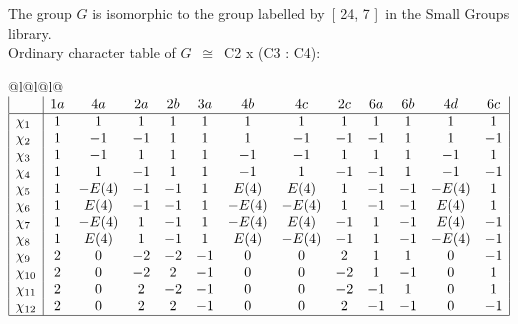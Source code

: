 \documentclass[varwidth=\maxdimen,border=10]{standalone}
\begin{document}
The group $G$ is isomorphic to the group labelled by\ [ 24, 7 ]\ in the Small Groups library.\\
Ordinary character table of $G$\ $\cong$\ C2 x (C3 : C4):\\
\begin{center}
\begin{tabular}{@{}l@{}l@{}l@{}}
\hline
\(\begin{array}{|l|cccccccccccc|}
  & 1a & 4a & 2a & 2b & 3a & 4b & 4c & 2c & 6a & 6b & 4d & 6c\\ \hline
\chi_{1} & 1 & 1 & 1 & 1 & 1 & 1 & 1 & 1 & 1 & 1 & 1 & 1\\
\chi_{2} & 1 & -1 & -1 & 1 & 1 & 1 & -1 & -1 & -1 & 1 & 1 & -1\\
\chi_{3} & 1 & -1 & 1 & 1 & 1 & -1 & -1 & 1 & 1 & 1 & -1 & 1\\
\chi_{4} & 1 & 1 & -1 & 1 & 1 & -1 & 1 & -1 & -1 & 1 & -1 & -1\\
\chi_{5} & 1 & -E(4) & -1 & -1 & 1 & E(4) & E(4) & 1 & -1 & -1 & -E(4) & 1\\
\chi_{6} & 1 & E(4) & -1 & -1 & 1 & -E(4) & -E(4) & 1 & -1 & -1 & E(4) & 1\\
\chi_{7} & 1 & -E(4) & 1 & -1 & 1 & -E(4) & E(4) & -1 & 1 & -1 & E(4) & -1\\
\chi_{8} & 1 & E(4) & 1 & -1 & 1 & E(4) & -E(4) & -1 & 1 & -1 & -E(4) & -1\\
\chi_{9} & 2 & 0 & -2 & -2 & -1 & 0 & 0 & 2 & 1 & 1 & 0 & -1\\
\chi_{10} & 2 & 0 & -2 & 2 & -1 & 0 & 0 & -2 & 1 & -1 & 0 & 1\\
\chi_{11} & 2 & 0 & 2 & -2 & -1 & 0 & 0 & -2 & -1 & 1 & 0 & 1\\
\chi_{12} & 2 & 0 & 2 & 2 & -1 & 0 & 0 & 2 & -1 & -1 & 0 & -1\\
\hline
\end{array}\)\\
\end{tabular}
\end{center}
\end{document}
